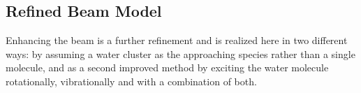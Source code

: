 \documentclass[11pt,DIV=13,BCOR=5mm,a4paper,headinclude]{scrbook}
\begin{document}
% 
% 
% 
% 

\subsection{Refined Beam Model}\label{refinedbeam}
Enhancing the beam is a further refinement and is realized here in two different ways: by assuming a water cluster as the approaching species rather than a single molecule, and as a second improved method by exciting the water molecule rotationally, vibrationally and with a combination of both.
\end{document}
